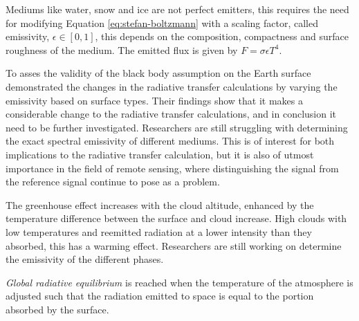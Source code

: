 Mediums like water, snow and ice are not perfect emitters, this requires the need for modifying Equation \eqref{eq:stefan-boltzmann} with a scaling factor, called emissivity, $\epsilon \in [0, 1]$, this depends on the composition, compactness and surface roughness of the medium. The emitted flux is given by $ F = \sigma \epsilon T ^4$. 

    To asses the validity of the black body assumption on the Earth surface \citeauthor{Huang2018ImprovedClimate} demonstrated the changes in the radiative transfer calculations by varying the emissivity based on surface types. Their findings show that it makes a considerable change to the radiative transfer calculations, and in conclusion it need to be further investigated. Researchers are still struggling with determining the exact spectral emissivity of different mediums. This is of interest for both implications to the radiative transfer calculation, but it is also of utmost importance in the field of remote sensing, where distinguishing the signal from the reference signal continue to pose as a problem.

The greenhouse effect increases with the cloud altitude, enhanced by the temperature difference between the surface and cloud increase. High clouds with low temperatures and reemitted radiation at a lower intensity than they absorbed, this has a warming effect. Researchers are still working on determine the emissivity of the different phases. 

\textit{Global radiative equilibrium} is reached when the temperature of the atmosphere is adjusted such that the radiation emitted to space is equal to the portion absorbed by the surface.



